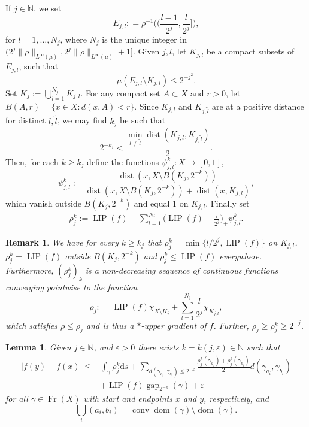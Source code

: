 \documentclass{amsart}
\newtheorem{lemma}[theorem]{Lemma}
\newtheorem{remark}[theorem]{Remark}
\numberwithin{equation}{section}
\newcommand{\N}{\mathbb{N}}
\newcommand{\dist}{\operatorname{dist}}
\newcommand{\LIP}{\operatorname{LIP}}
\newcommand{\gap}{\operatorname{gap}}
\newcommand{\dom}{\operatorname{dom}}
\newcommand{\Fr}{\operatorname{Fr}}
\newcommand{\conv}{\operatorname{conv}}
\newcommand{\ud}{\mathrm {d}}
\newcommand{\inv}{^{-1}}
\newcommand{\defl}{\mathrel{\mathop:}=}
\begin{document}
If $j\in\N$, we set
\[
E_{j,l}\defl\rho\inv\bigg(\Big(\frac{l-1}{2^{j}},\frac{l}{2^{j}}\Big]\bigg),
\]
for $l=1,\ldots, N_j$, where $N_j$ is the unique integer in $(2^j\|\rho\|_{L^\infty(\mu)},2^j\|\rho\|_{L^\infty(\mu)}+1]$. 
Given $j,l$, let $K_{j,l}$ be a compact subsets of $E_{j,l}$, such that
\[
\mu(E_{j,l}\setminus K_{j,l})\le 2^{-j^2}.
\]
Set $\displaystyle K_j:=\bigcup_{l=1}^{N_j}K_{j,l}$. For any compact set $A\subset X$ and $r>0$, let $B(A,r)=\{x\in X: d(x,A)< r\}$.  Since $K_{j,l}$ and $K_{j,\tilde l}$ are at a positive distance for distinct $l,\tilde l$, we may find $k_j$ be such that
\[2^{-k_j}<\frac{\min_{l\ne\tilde l}\dist(K_{j,l},K_{j,\tilde l})}{2}.\]
Then, for each $k\geq k_j$ define the functions $\psi_{j,l}^{k}:X\to [0,1]$, 
\[
\psi_{j,l}^{k}:=\frac{\dist(x,X\setminus B(K_{j},2^{-k}))}{\dist(x,X \setminus B(K_{j},2^{-k}))+\dist(x,K_{j,l})},\]
which vanish outside $B(K_{j},2^{-k})$ and equal $1$ on $K_{j,l}$. Finally set
\begin{align*}
\rho_j^{k}:=\LIP(f)-\sum_{l=1}^{N_j}\Big(\LIP(f)-\frac{l}{2^{j}}\Big)_+\psi_{j,l}^{k}.
\end{align*}


\begin{remark}\label{rmk:ptwise-incr-limit}
We have for every $k\geq k_j$ that $\rho_j^{k}=\min\{l/2^j,\LIP(f)\}$ on $K_{j,l}$, $\rho_j^{k}=\LIP(f)$ outside $B(K_j,2^{-k})$ and $\rho_j^{k}\le \LIP(f)$ everywhere. Furthermore, $(\rho_j^{k})_k$ is a non-decreasing sequence of continuous functions converging pointwise to the function
\[
\rho_j\defl\LIP(f)\chi_{X\setminus K_j}+\sum_{l=1}^{N_j}\frac{l}{2^j}\chi_{K_{j,l}},
\]
which satisfies $\rho\le \rho_{j}$ and is thus a $\ast$-upper gradient of $f$. Further, $\rho_j \geq \rho_j^k \geq 2^{-j}$.
\end{remark}

\begin{lemma}\label{lem:ug+e}
    Given $j\in\N$, and $\varepsilon>0$ there exists $k=k(j,\varepsilon)\in \N$ such that 
    \begin{align*}
    |f(y)-f(x)|\le &\int_{\gamma}\rho_j^k\ud s +\sum_{d(\gamma_{a_i},\gamma_{b_i})\le 2^{-k}}\frac{\rho^k_j(\gamma_{a_i})+\rho^k_j(\gamma_{b_i})}{2}d(\gamma_{a_i},\gamma_{b_i})\\ & +\LIP(f)\gap_{2^{-k}}(\gamma)+\varepsilon
    \end{align*}
    for all $\gamma\in\Fr(X)$ with start and endpoints $x$ and $y$, respectively, and
    \[
    \displaystyle \bigcup_i(a_i,b_i)=\conv{\dom(\gamma)}\setminus \dom(\gamma).
    \]
\end{lemma} 
\end{document}

